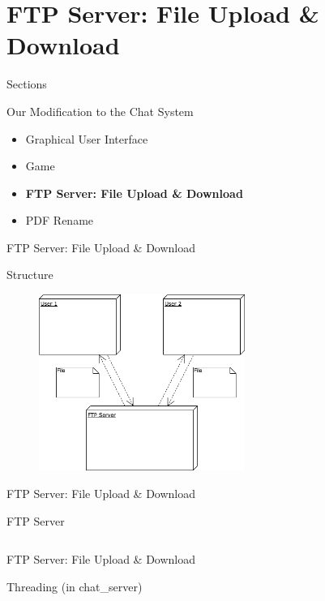 \documentclass[a4paper,10pt]{beamer}
\begin{document}
\section{FTP Server: File Upload \& Download}

\begin{frame}{Sections}
\begin{block}{Our Modification to the Chat System}
\begin{itemize}
		\item Graphical User Interface
		\item Game
		\item \textbf{FTP Server: File Upload \& Download}
		\item PDF Rename
		
\end{itemize}
\end{block}
\end{frame}

\begin{frame}{FTP Server: File Upload \& Download}
\begin{block}{Structure}
\begin{figure}[H]
    \includegraphics[width=0.6\textwidth]{Structure.png}
\end{figure}
\end{block}
\end{frame}

\begin{frame}{FTP Server: File Upload \& Download}
	\begin{block}{FTP Server}
	\inputminted[linenos]{python}{file_server.py}
	\end{block}
\end{frame}

\begin{frame}{FTP Server: File Upload \& Download}
	\begin{block}{Threading (in chat\_server)}
	\inputminted[linenos]{python}{threading.py}
	\end{block}
\end{frame}
\end{document}
